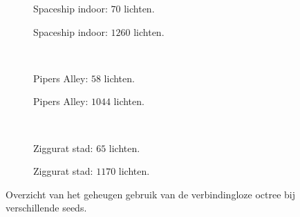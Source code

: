 \begin{figure}[p]
  \begin{adjustbox}{minipage=\textwidth, scale=0.6}
    \begin{subfigure}[b]{0.83\textwidth}
      \centering
      \def\svgwidth{\textwidth}
      
      \caption{Spaceship indoor: $70$ lichten.}
      \label{fig:hs-seed-memory::si-low}
    \end{subfigure}
  \end{adjustbox} %
  \begin{adjustbox}{minipage=\textwidth, scale=0.6}
    \begin{subfigure}[b]{0.83\textwidth}
      \centering
      \def\svgwidth{\textwidth}
      
      \caption{Spaceship indoor: $1260$ lichten.}
      \label{fig:hs-seed-memory::si-high}
    \end{subfigure}
  \end{adjustbox} \\
  \begin{adjustbox}{minipage=\textwidth, scale=0.6}
    \begin{subfigure}[b]{0.83\textwidth}
      \centering
      \def\svgwidth{\textwidth}
      
      \caption{Pipers Alley: $58$ lichten.}
      \label{fig:hs-seed-memory::pa-low}
    \end{subfigure}
  \end{adjustbox} %
  \begin{adjustbox}{minipage=\textwidth, scale=0.6}
    \begin{subfigure}[b]{0.83\textwidth}
      \centering
      \def\svgwidth{\textwidth}
      
      \caption{Pipers Alley: $1044$ lichten.}
      \label{fig:hs-seed-memory::pa-high}
    \end{subfigure}
  \end{adjustbox} \\
  \begin{adjustbox}{minipage=\textwidth, scale=0.6}
    \begin{subfigure}[b]{0.83\textwidth}
      \centering
      \def\svgwidth{\textwidth}
      
      \caption{Ziggurat stad: $65$ lichten.}
      \label{fig:hs-seed-memory::zc-low}
    \end{subfigure}
  \end{adjustbox} %
  \begin{adjustbox}{minipage=\textwidth, scale=0.6}
    \begin{subfigure}[b]{0.83\textwidth}
      \centering
      \def\svgwidth{\textwidth}
      
      \caption{Ziggurat stad: $1170$ lichten.}
      \label{fig:hs-seed-memory::zc-high}
    \end{subfigure}
  \end{adjustbox}
  \caption{Overzicht van het geheugen gebruik van de verbindingloze octree
           bij verschillende seeds.}
  \label{fig:hs-seed-memory}
\end{figure}

